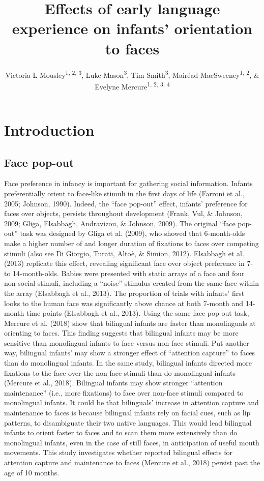 \documentclass[english,man,floatsintext]{apa6}
\author{Victoria L Mousley\textsuperscript{1, 2, 3}, Luke Mason\textsuperscript{3}, Tim Smith\textsuperscript{3}, Mairéad MacSweeney\textsuperscript{1, 2}, \& Evelyne Mercure\textsuperscript{1, 2, 3, 4}}
\affiliation{
\vspace{0.5cm}
\textsuperscript{1} UCL Institute of Cognitive Neuroscience\\\textsuperscript{2} UCL Deafness, Cognition and Language Research Centre\\\textsuperscript{3} Birkbeck, University of London\\\textsuperscript{4} Goldsmith's, University of London}
\title{Effects of early language experience on infants' orientation to faces}
\date{}
\begin{document}
\maketitle

\hypertarget{introduction}{%
\section{Introduction}\label{introduction}}

\hypertarget{face-pop-out}{%
\subsection{Face pop-out}\label{face-pop-out}}

Face preference in infancy is important for gathering social information. Infants preferentially orient to face-like stimuli in the first days of life (Farroni et al., 2005; Johnson, 1990). Indeed, the \enquote{face pop-out} effect, infants' preference for faces over objects, persists throughout development (Frank, Vul, \& Johnson, 2009; Gliga, Elsabbagh, Andravizou, \& Johnson, 2009). The original \enquote{face pop-out} task was designed by Gliga et al. (2009), who showed that 6-month-olds make a higher number of and longer duration of fixations to faces over competing stimuli (also see Di Giorgio, Turati, Altoè, \& Simion, 2012). Elsabbagh et al. (2013) replicate this effect, revealing significant face over object preference in 7- to 14-month-olds. Babies were presented with static arrays of a face and four non-social stimuli, including a \enquote{noise} stimulus created from the same face within the array (Elsabbagh et al., 2013). The proportion of trials with infants' first looks to the human face was significantly above chance at both 7-month and 14-month time-points (Elsabbagh et al., 2013).
Using the same face pop-out task, Mercure et al. (2018) show that bilingual infants are faster than monolinguals at orienting to faces. This finding suggests that bilingual infants may be more sensitive than monolingual infants to face versus non-face stimuli. Put another way, bilingual infants' may show a stronger effect of \enquote{attention capture} to faces than do monolingual infants. In the same study, bilingual infants directed more fixations to the face over the non-face stimuli than do monolingual infants (Mercure et al., 2018). Bilingual infants may show stronger \enquote{attention maintenance} (i.e., more fixations) to face over non-face stimuli compared to monolingual infants. It could be that bilinguals' increase in attention capture and maintenance to faces is because bilingual infants rely on facial cues, such as lip patterns, to disambiguate their two native languages. This would lead bilingual infants to orient faster to faces and to scan them more extensively than do monolingual infants, even in the case of still faces, in anticipation of useful mouth movements. This study investigates whether reported bilingual effects for attention capture and maintenance to faces (Mercure et al., 2018) persist past the age of 10 months.
\end{document}
